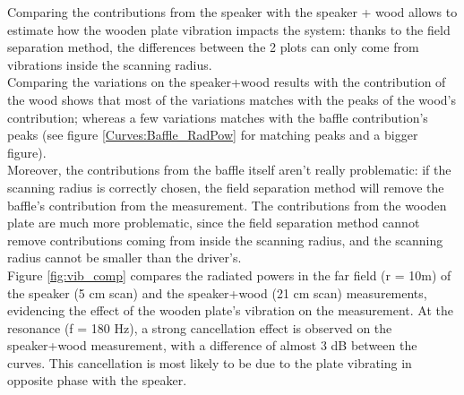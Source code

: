 \documentclass{report}
\begin{document}
\vspace{0.5cm}

Comparing the contributions from the speaker with the speaker + wood allows to estimate how the wooden plate vibration impacts the system: thanks to the field separation method, the differences between the 2 plots can only come from vibrations inside the scanning radius.\\
Comparing the variations on the speaker+wood results with the contribution of the wood shows that most of the variations matches with the peaks of the wood's contribution; whereas a few variations matches with the baffle contribution's peaks (see figure \ref{Curves:Baffle_RadPow} for matching peaks and a bigger figure). \\

Moreover, the contributions from the baffle itself aren't really problematic: if the scanning radius is correctly chosen, the field separation method will remove the baffle's contribution from the measurement. The contributions from the wooden plate are much more problematic, since the field separation method cannot remove contributions coming from inside the scanning radius, and the scanning radius cannot be smaller than the driver's. \\

Figure \ref{fig:vib_comp} compares the radiated powers in the far field (r = 10m) of the speaker (5 cm scan) and the speaker+wood (21 cm scan) measurements, evidencing the effect of the wooden plate's vibration on the measurement. At the resonance (f = 180 Hz), a strong cancellation effect is observed on the speaker+wood measurement, with a difference of almost 3 dB between the curves. This cancellation is most likely to be due to the plate vibrating in opposite phase with the speaker. \\
\end{document}
